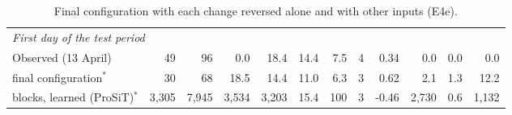 \begin{table}[htbp]
\begin{tabular}{lrrrrrrrrrrr}
\midrule
\multicolumn{12}{l}{\textit{First day of the test period}} \\
Observed (13 April) & 49 & 96 & 0.0 & 18.4 & 14.4 & 7.5 & 4 & 0.34 & 0.0 & 0.0 & 0.0 \\
final configuration$^{*}$ & 30 & 68 & 18.5 & 14.4 & 11.0 & 6.3 & 3 & 0.62 & 2.1 & 1.3 & 12.2 \\
blocks, learned (ProSiT)$^{*}$ & 3{,}305 & 7{,}945 & 3{,}534 & 3{,}203 & 15.4 & 100 & 3 & -0.46 & 2{,}730 & 0.6 & 1{,}132 \\
\bottomrule
\end{tabular}
\par{}
\caption{Final configuration with each change reversed alone and with other inputs (E4e).}
\label{tab:rq2_loo}
\end{table}
